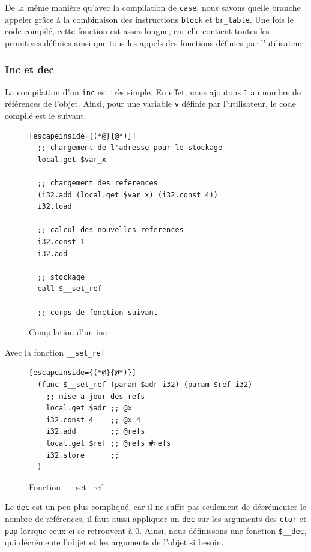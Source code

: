 \documentclass{rapportECL}
\begin{document}
De la même manière qu'avec la compilation de \verb|case|, nous savons quelle branche appeler grâce à la 
combinaison des instructions \verb|block| et \verb|br_table|. Une fois le code compilé, cette fonction est assez longue, 
car elle contient toutes les primitives définies ainsi que tous les appels des fonctions définies par l'utilisateur.

\subsubsection{Inc et dec}

La compilation d'un \verb|inc| est très simple. En effet, nous ajoutons \verb|1| au nombre de références de l'objet. 
Ainsi, pour une variable \verb|v| définie par l'utilisateur, le code compilé est le suivant.

\begin{figure}[H]
	\begin{lstlisting}[escapeinside={(*@}{@*)}]
  ;; chargement de l'adresse pour le stockage
  local.get $var_x

  ;; chargement des references
  (i32.add (local.get $var_x) (i32.const 4))
  i32.load
   
  ;; calcul des nouvelles references
  i32.const 1
  i32.add

  ;; stockage
  call $__set_ref

  ;; corps de fonction suivant
	\end{lstlisting}
	\caption{Compilation d'un inc}
	\label{listing:compile_inc}
\end{figure}

Avec la fonction \verb|__set_ref|

\begin{figure}[H]
	\begin{lstlisting}[escapeinside={(*@}{@*)}]
  (func $__set_ref (param $adr i32) (param $ref i32)
    ;; mise a jour des refs
    local.get $adr ;; @x
    i32.const 4    ;; @x 4
    i32.add        ;; @refs
    local.get $ref ;; @refs #refs
    i32.store      ;;
  )
	\end{lstlisting}
	\caption{Fonction \_\_set\_ref}
	\label{listing:set_ref}
\end{figure}

Le \verb|dec| est un peu plus compliqué, car il ne suffit pas seulement de décrémenter le nombre de références, il faut aussi 
appliquer un \verb|dec| sur les arguments des \verb|ctor| et \verb|pap| lorsque ceux-ci se retrouvent à 0.
Ainsi, nous définissons une fonction \verb|$__dec|, qui décrémente l'objet et les arguments de l'objet si besoin.
\end{document}
